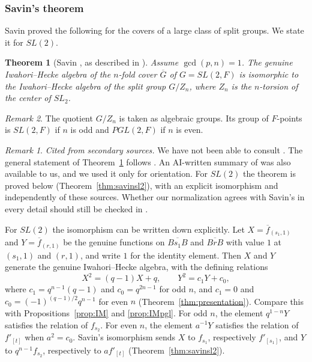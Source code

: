 \documentclass[12pt,letterpaper]{amsart}
\numberwithin{equation}{section}
\newtheorem{theorem}{Theorem}[section]
\theoremstyle{definition}
\theoremstyle{remark}
\newtheorem{remark}[theorem]{Remark}
\newtheorem{vremark}{Remark}
\newcommand{\Gbar}{\overline{G}}
\newcommand{\fbar}{\overline{f}}
\begin{document}
\subsubsection{Savin's theorem}
Savin proved the following for the covers of a large class of split
groups. We state it for $SL(2)$.

\begin{theorem}[Savin {\cite{Sa88}}, as described in {\cite{Ka21}}]
\label{thm:savin}
Assume $\gcd(p,n)=1$. The genuine Iwahori--Hecke algebra of the
$n$-fold cover $\Gbar$ of $G=SL(2,F)$ is isomorphic to the
Iwahori--Hecke algebra of the split group $G/Z_n$, where $Z_n$ is the
$n$-torsion of the center of $SL_2$.
\end{theorem}

\begin{remark}
\label{rem:savin}
The quotient $G/Z_n$ is taken as algebraic groups. Its group of
$F$-points is $SL(2,F)$ if $n$ is odd and $PGL(2,F)$ if $n$ is even.
\end{remark}

\begin{vremark}
\label{vrem:savin}
\emph{Cited from secondary sources.} We have not been able to consult
\cite{Sa88}. The general statement of Theorem~\ref{thm:savin} follows
\cite{Ka21}. An AI-written summary of \cite{Sa88} was also available to
us, and we used it only for orientation. For $SL(2)$ the theorem is
proved below (Theorem~\ref{thm:savinsl2}), with an explicit
isomorphism and independently of these sources. Whether our
normalization agrees with Savin's in every detail should still be
checked in \cite{Sa88}.
\end{vremark}

For $SL(2)$ the isomorphism can be written down explicitly. Let
$X=\fbar_{(s_1,1)}$ and $Y=\fbar_{(r,1)}$ be the genuine functions on
$\overline{Bs_1B}$ and $\overline{BrB}$ with value $1$ at $(s_1,1)$
and $(r,1)$, and write $1$ for the identity element. Then $X$ and $Y$
generate the genuine Iwahori--Hecke algebra, with the defining relations
\[
X^2=(q-1)X+q,\qquad Y^2=c_1Y+c_0,
\]
where $c_1=q^{n-1}(q-1)$ and $c_0=q^{2n-1}$ for odd $n$, and $c_1=0$
and $c_0=(-1)^{(q-1)/2}q^{n-1}$ for even $n$
(Theorem~\ref{thm:presentation}). Compare this with
Propositions~\ref{prop:IM} and \ref{prop:IMpgl}. For odd $n$, the
element $q^{1-n}Y$ satisfies the relation of $f_{s_2}$. For even $n$,
the element $a^{-1}Y$ satisfies the relation of $f'_{[t]}$ when
$a^2=c_0$. Savin's isomorphism sends $X$ to $f_{s_1}$, respectively
$f'_{[s_1]}$, and $Y$ to $q^{n-1}f_{s_2}$, respectively to
$af'_{[t]}$ (Theorem~\ref{thm:savinsl2}).
\end{document}

